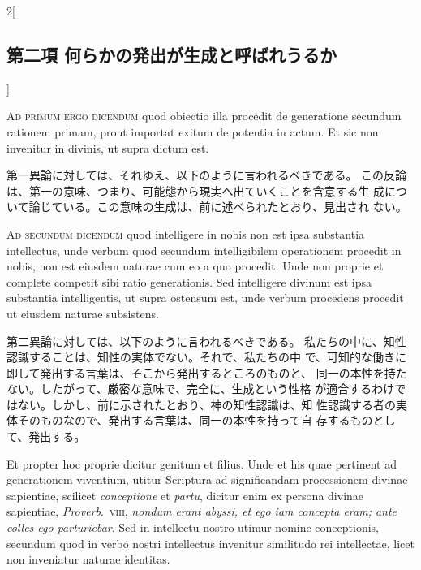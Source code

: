 \documentclass[paper=a4paper,fontsize=10pt,jafontsize=9pt,titlepage]{jlreq}
\begin{document}
\begin{paracol}{2}[\subsection{第二項 何らかの発出が生成と呼ばれうるか}]
\switchcolumn*[\subsection{ad.1}]


{\scshape Ad primum ergo dicendum} quod obiectio illa procedit de generatione
secundum rationem primam, prout importat exitum de potentia in actum. Et
sic non invenitur in divinis, ut supra dictum est.


\switchcolumn


第一異論に対しては、それゆえ、以下のように言われるべきである。
この反論は、第一の意味、つまり、可能態から現実へ出ていくことを含意する生
 成について論じている。この意味の生成は、前に述べられたとおり、見出され
 ない。


\switchcolumn*[\subsection{ad.2}]


{\scshape Ad secundum dicendum} quod intelligere in nobis non est ipsa substantia
intellectus, unde verbum quod secundum intelligibilem operationem
procedit in nobis, non est eiusdem naturae cum eo a quo procedit. Unde
non proprie et complete competit sibi ratio generationis. Sed
intelligere divinum est ipsa substantia intelligentis, ut supra ostensum
est, unde verbum procedens procedit ut eiusdem naturae subsistens.


\switchcolumn


第二異論に対しては、以下のように言われるべきである。
私たちの中に、知性認識することは、知性の実体でない。それで、私たちの中
 で、可知的な働きに即して発出する言葉は、そこから発出するところのものと、
 同一の本性を持たない。したがって、厳密な意味で、完全に、生成という性格
 が適合するわけではない。しかし、前に示されたとおり、神の知性認識は、知
 性認識する者の実体そのものなので、発出する言葉は、同一の本性を持って自
 存するものとして、発出する。


\switchcolumn*


Et
propter hoc proprie dicitur genitum et filius. Unde et his quae
pertinent ad generationem viventium, utitur Scriptura ad significandam
processionem divinae sapientiae, scilicet {\itshape conceptione} et {\itshape partu}, dicitur
enim ex persona divinae sapientiae, {\itshape Proverb}.~{\scshape viii}, {\itshape nondum erant abyssi,
et ego iam concepta eram; ante colles ego parturiebar}. Sed in intellectu
nostro utimur nomine conceptionis, secundum quod in verbo nostri
intellectus invenitur similitudo rei intellectae, licet non inveniatur
naturae identitas.



\end{paracol}
\end{document}
